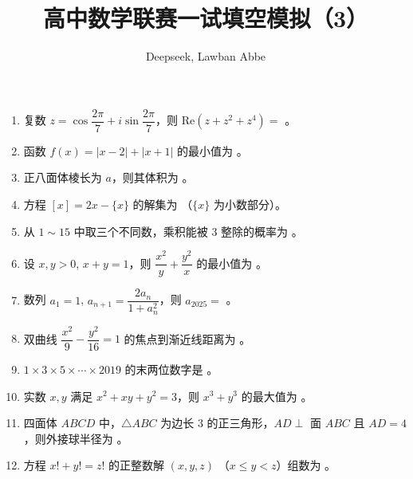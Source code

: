 \documentclass[a4paper,10pt,UTF8]{ctexart}
\title{高中数学联赛一试填空模拟（3）}
\author{Deepseek, Lawban Abbe}
\begin{document}
	\maketitle
	\begin{enumerate}
		\item 复数 $z = \cos \dfrac{2\pi}{7} + i \sin \dfrac{2\pi}{7}$，则 $\text{Re}(z + z^2 + z^4) =$ \underline{\qquad}。
		
		\item 函数 $f(x) = |x - 2| + |x + 1|$ 的最小值为 \underline{\qquad}。
		
		\item 正八面体棱长为 $a$，则其体积为 \underline{\qquad}。
		
		\item 方程 $[x] = 2x - \{x\}$ 的解集为 \underline{\qquad}（$\{x\}$ 为小数部分）。
		
		\item 从 $1\sim 15$ 中取三个不同数，乘积能被 $3$ 整除的概率为 \underline{\qquad}。
		
		\item 设 $x, y > 0$, $x + y = 1$，则 $\dfrac{x^2}{y} + \dfrac{y^2}{x}$ 的最小值为 \underline{\qquad}。
		
		\item 数列 $a_1 = 1$, $a_{n+1} = \dfrac{2a_n}{1 + a_n^2}$，则 $a_{2025} =$ \underline{\qquad}。
		
		\item 双曲线 $\dfrac{x^2}{9} - \dfrac{y^2}{16} = 1$ 的焦点到渐近线距离为 \underline{\qquad}。
		
		\item $1 \times 3 \times 5 \times \cdots \times 2019$ 的末两位数字是 \underline{\qquad}。
		
		\item 实数 $x, y$ 满足 $x^2 + xy + y^2 = 3$，则 $x^3 + y^3$ 的最大值为 \underline{\qquad}。
		
		\item 四面体 $ABCD$ 中，$\triangle ABC$ 为边长 $3$ 的正三角形，$AD \perp$ 面 $ABC$ 且 $AD=4$，则外接球半径为 \underline{\qquad}。
		
		\item 方程 $x! + y! = z!$ 的正整数解 $(x,y,z)$ （$x \leq y < z$）组数为 \underline{\qquad}。
	\end{enumerate}
\end{document}
